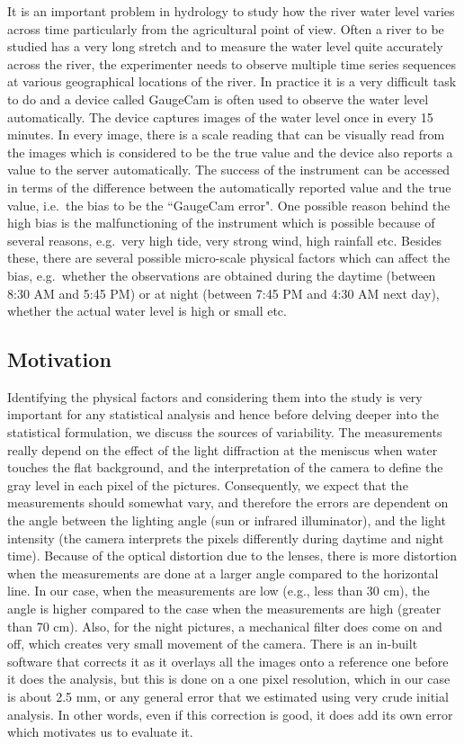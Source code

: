 \documentclass[]{article}
\begin{document}
It is an important problem in hydrology to study how the river water level varies across time particularly from the agricultural point of view. Often a river to be studied has a very long stretch and to measure the water level quite accurately across the river, the experimenter needs to observe multiple time series sequences at various geographical locations of the river. In practice it is a very difficult task to do and a device called GaugeCam is often used to observe the water level automatically. The device captures images of the water level once in every 15 minutes. In every image, there is a scale reading that can be visually read from the images which is considered to be the true value and the device also reports a value to the server automatically. The success of the instrument can be accessed in terms of the difference between the automatically reported value and the true value, i.e.~the bias to be the ``GaugeCam error". One possible reason behind the high bias is the malfunctioning of the instrument which is possible because of several reasons, e.g.~very high tide, very strong wind, high rainfall etc. Besides these, there are several possible micro-scale physical factors which can affect the bias, e.g.~whether the observations are obtained during the daytime (between 8:30 AM and 5:45 PM) or at night (between 7:45 PM and 4:30 AM next day), whether the actual water level is high or small etc.

\subsection{Motivation}

Identifying the physical factors and considering them into the study is very important for any statistical analysis and hence before delving deeper into the statistical formulation, we discuss the sources of variability. The measurements really depend on the effect of the light diffraction at the meniscus when water touches the flat background, and the interpretation of the camera to define the gray level in each pixel of the pictures. Consequently, we expect that the measurements should somewhat vary, and therefore the errors are dependent on the angle between the lighting angle (sun or infrared illuminator), and the light intensity (the camera interprets the pixels differently during daytime and night time). Because of the optical distortion due to the lenses, there is more distortion when the measurements are done at a larger angle compared to the horizontal line. In our case, when the measurements are low (e.g., less than 30 cm), the angle is higher compared to the case when the measurements are high (greater than 70 cm). Also, for the night pictures, a mechanical filter does come on and off, which creates very small movement of the camera. There is an in-built software that corrects it as it overlays all the images onto a reference one before it does the analysis, but this is done on a one pixel resolution, which in our case is about 2.5 mm, or any general error that we estimated using very crude initial analysis. In other words, even if this correction is good, it does add its own error which motivates us to evaluate it.
\end{document}
